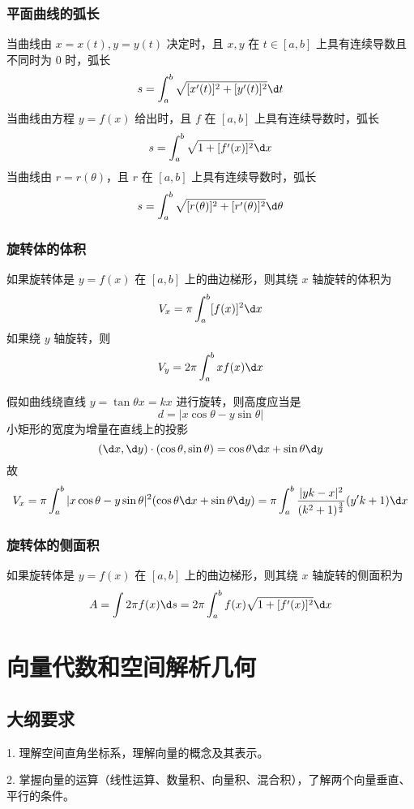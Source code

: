 \subsubsection*{平面曲线的弧长}

当曲线由 $x = x(t), y = y(t)$ 决定时，且 $x, y$ 在 $t \in [a, b]$ 上具有连续导数且不同时为 $0$ 时，弧长
\[ s = \int_{a}^{b} \sqrt{[x'(t)]^2 + [y'(t)]^2} \d t \]
当曲线由方程 $y = f(x)$ 给出时，且 $f$ 在 $[a, b]$ 上具有连续导数时，弧长
\[ s = \int_{a}^{b} \sqrt{1 + [f'(x)]^2} \d x \]
当曲线由 $r = r(\theta)$，且 $r$ 在 $[a, b]$ 上具有连续导数时，弧长
\[ s = \int_{a}^{b} \sqrt{[r(\theta)]^2 + [r'(\theta)]^2} \d \theta \]


\subsubsection*{旋转体的体积}

如果旋转体是 $y = f(x)$ 在 $[a, b]$ 上的曲边梯形，则其绕 $x$ 轴旋转的体积为
\[ V_x = \pi \int_a^b [f(x)]^2 \d x \]
如果绕 $y$ 轴旋转，则
\[ V_y = 2\pi \int_{a}^{b} x f(x) \d x \]

假如曲线绕直线 $y = \tan \theta x = k x$ 进行旋转，则高度应当是
\[ d = |x \cos \theta - y \sin \theta| \]
小矩形的宽度为增量在直线上的投影
\[ (\d x, \d y) \cdot (\cos \theta, \sin \theta) = \cos \theta \d x + \sin \theta \d y \]
故
\[ V_x = \pi \int_a^b |x \cos \theta - y \sin \theta|^2(\cos \theta \d x + \sin \theta \d y) = \pi \int_a^b \frac{|yk-x|^2}{(k^2+1)^{\frac{3}{2}}}(y'k+1) \d x \]

\subsubsection*{旋转体的侧面积}

如果旋转体是 $y = f(x)$ 在 $[a, b]$ 上的曲边梯形，则其绕 $x$ 轴旋转的侧面积为
\[ A = \int 2\pi f(x) \d s = 2\pi \int_{a}^{b} f(x) \sqrt{1 + [f'(x)]^2} \d x \]


\section{向量代数和空间解析几何}

\subsection{大纲要求}

1. 理解空间直角坐标系，理解向量的概念及其表示。

2. 掌握向量的运算（线性运算、数量积、向量积、混合积），了解两个向量垂直、平行的条件。

